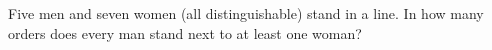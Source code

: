 Five men and seven women (all distinguishable) stand in a line. In how many orders does every man stand next to at least one woman?
